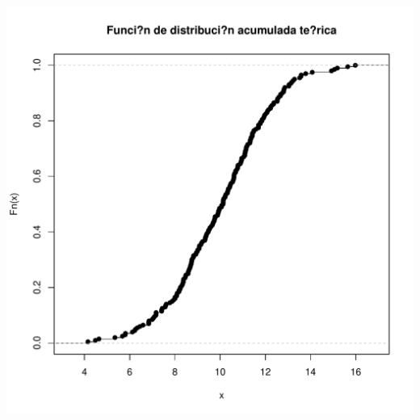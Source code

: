 \documentclass[10pt,a4paper]{article}\usepackage[]{graphicx}\usepackage[]{color}
\makeatletter
\def\maxwidth{ %
  \ifdim\Gin@nat@width>\linewidth
    \linewidth
  \else
    \Gin@nat@width
  \fi
}
\newenvironment{knitrout}{}{} %
\makeatother
\begin{document}
\begin{knitrout}
\includegraphics[width=\maxwidth]{figure/unnamed-chunk-5-3} 

\end{knitrout}
\end{document}
